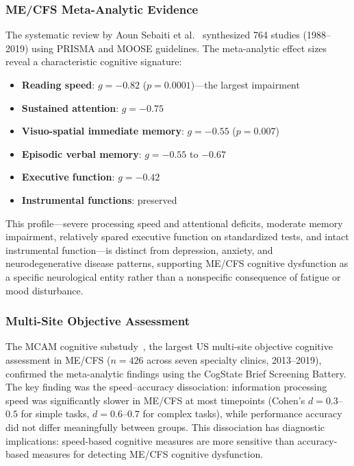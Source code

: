 \subsubsection{ME/CFS Meta-Analytic Evidence}

The systematic review by Aoun Sebaiti et al.~\cite{Sebaiti2022cognitive} synthesized 764 studies (1988--2019) using PRISMA and MOOSE guidelines. The meta-analytic effect sizes reveal a characteristic cognitive signature:

\begin{itemize}
    \item \textbf{Reading speed}: $g = -0.82$ ($p = 0.0001$)---the largest impairment
    \item \textbf{Sustained attention}: $g = -0.75$
    \item \textbf{Visuo-spatial immediate memory}: $g = -0.55$ ($p = 0.007$)
    \item \textbf{Episodic verbal memory}: $g = -0.55$ to $-0.67$
    \item \textbf{Executive function}: $g = -0.42$
    \item \textbf{Instrumental functions}: preserved
\end{itemize}

This profile---severe processing speed and attentional deficits, moderate memory impairment, relatively spared executive function on standardized tests, and intact instrumental function---is distinct from depression, anxiety, and neurodegenerative disease patterns, supporting ME/CFS cognitive dysfunction as a specific neurological entity rather than a nonspecific consequence of fatigue or mood disturbance.

\subsubsection{Multi-Site Objective Assessment}

The MCAM cognitive substudy~\cite{Lange2024cognitive}, the largest US multi-site objective cognitive assessment in ME/CFS ($n = 426$ across seven specialty clinics, 2013--2019), confirmed the meta-analytic findings using the CogState Brief Screening Battery. The key finding was the speed--accuracy dissociation: information processing speed was significantly slower in ME/CFS at most timepoints (Cohen's $d = 0.3$--$0.5$ for simple tasks, $d = 0.6$--$0.7$ for complex tasks), while performance accuracy did not differ meaningfully between groups. This dissociation has diagnostic implications: speed-based cognitive measures are more sensitive than accuracy-based measures for detecting ME/CFS cognitive dysfunction.

